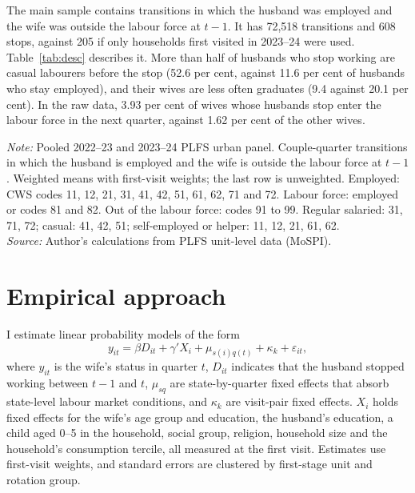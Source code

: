 The main sample contains transitions in which the husband was employed and the wife was outside the labour force at $t-1$. It has 72,518 transitions and 608 stops, against 205 if only households first visited in 2023--24 were used. Table~\ref{tab:desc} describes it. More than half of husbands who stop working are casual labourers before the stop (52.6 per cent, against 11.6 per cent of husbands who stay employed), and their wives are less often graduates (9.4 against 20.1 per cent). In the raw data, 3.93 per cent of wives whose husbands stop enter the labour force in the next quarter, against 1.62 per cent of the other wives.

\begin{table}[htbp]
\centering
\caption{Couples in the entry sample, by whether the husband stops working}
\label{tab:desc}
\small
\begin{minipage}{\linewidth}\footnotesize\vspace{4pt}
\textit{Note:} Pooled 2022--23 and 2023--24 PLFS urban panel. Couple-quarter transitions in which the husband is employed and the wife is outside the labour force at $t-1$. Weighted means with first-visit weights; the last row is unweighted. Employed: CWS codes 11, 12, 21, 31, 41, 42, 51, 61, 62, 71 and 72. Labour force: employed or codes 81 and 82. Out of the labour force: codes 91 to 99. Regular salaried: 31, 71, 72; casual: 41, 42, 51; self-employed or helper: 11, 12, 21, 61, 62.\\
\textit{Source:} Author's calculations from PLFS unit-level data (MoSPI).
\end{minipage}
\end{table}

\section{Empirical approach}

I estimate linear probability models of the form
\begin{equation*}
y_{it} = \beta D_{it} + \gamma' X_{i} + \mu_{s(i)q(t)} + \kappa_{k} + \varepsilon_{it},
\end{equation*}
where $y_{it}$ is the wife's status in quarter $t$, $D_{it}$ indicates that the husband stopped working between $t-1$ and $t$, $\mu_{sq}$ are state-by-quarter fixed effects that absorb state-level labour market conditions, and $\kappa_k$ are visit-pair fixed effects. $X_i$ holds fixed effects for the wife's age group and education, the husband's education, a child aged 0--5 in the household, social group, religion, household size and the household's consumption tercile, all measured at the first visit. Estimates use first-visit weights, and standard errors are clustered by first-stage unit and rotation group.

